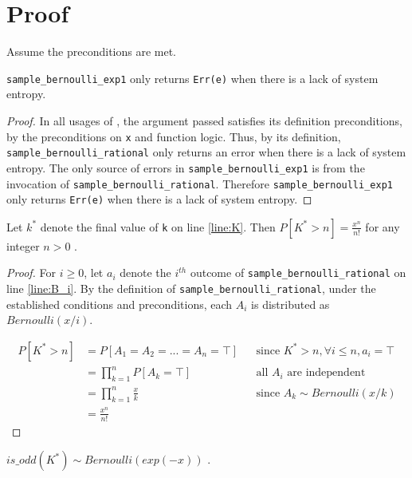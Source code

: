 \documentclass{article}
\begin{document}
\section{Proof}
Assume the preconditions are met.

\begin{lemma}
    \label{err-e}
    \texttt{sample\_bernoulli\_exp1} only returns \texttt{Err(e)} when there is a lack of system entropy.
\end{lemma}

\begin{proof}
    In all usages of , the argument passed satisfies its definition preconditions,
    by the preconditions on \texttt{x} and function logic.
    Thus, by its definition, \texttt{sample\_bernoulli\_rational} only returns an error when there is a lack of system entropy.
    The only source of errors in \texttt{sample\_bernoulli\_exp1} is from the invocation of \texttt{sample\_bernoulli\_rational}.
    Therefore \texttt{sample\_bernoulli\_exp1} only returns \texttt{Err(e)} when there is a lack of system entropy.
\end{proof}

\begin{lemma}
    \label{P_K_gt_n}
    Let $k^{*}$ denote the final value of \texttt{k} on line \ref{line:K}.
    Then $P[K^{*} > n] = \frac{x^n}{n!}$ for any integer $n > 0$ \cite{CKS20}.
\end{lemma}

\begin{proof}
    For $i \ge 0$, let $a_i$ denote the $i^{th}$ outcome of \texttt{sample\_bernoulli\_rational} on line \ref{line:B_i}.
    By the definition of \texttt{sample\_bernoulli\_rational}, under the established conditions and preconditions,
    each $A_i$ is distributed as $Bernoulli(x / i)$.

    \begin{align*}
        P[K^{*} > n] &= P[A_1 = A_2 = ... = A_n = \top] && \text{since } K^{*} > n, \forall i \leq n, a_i = \top \\
        &= \prod_{k=1}^n P[A_k = \top] && \text{all $A_i$ are independent} \\
        &= \prod_{k=1}^n \frac{x}{k} && \text{since $A_k \sim Bernoulli(x/k)$} \\
        &= \frac{x^n}{n!}
    \end{align*}
\end{proof}

\begin{lemma}
    \label{ok-out}
    $is\_odd(K^{*}) \sim Bernoulli(exp(-x))$ \cite{CKS20}.
\end{lemma}
\end{document}
